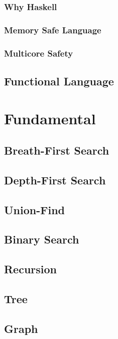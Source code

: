 \documentclass{kdp}
\begin{document}
\section{Why Haskell}

\section{Memory Safe Language}

\section{Multicore Safety}

\chapter{Functional Language}

\part{Fundamental}

\chapter{Breath-First Search}

\chapter{Depth-First Search}



\chapter{Union-Find}

\chapter{Binary Search}

\chapter{Recursion}

\chapter{Tree}

\chapter{Graph}
\end{document}
